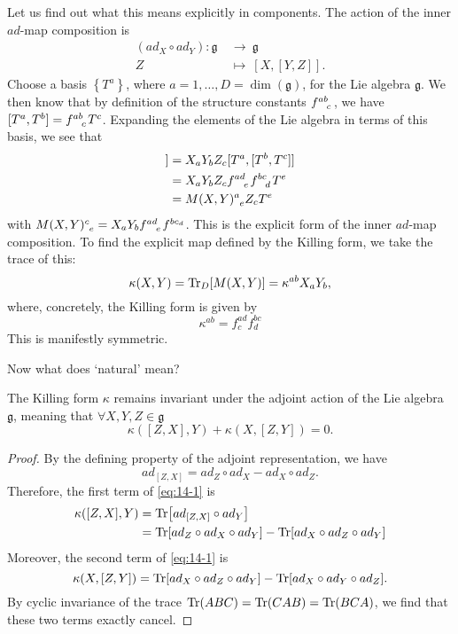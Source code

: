 Let us find out what this means explicitly in components.
The action of the inner $ad$-map composition is
\begin{equation}
  \begin{split}
    (ad_X \circ ad_Y) \colon \mathfrak{g} \ &\to\  \mathfrak{g} \\
    Z \ &\mapsto\  [X,[Y, Z]].
  \end{split}
\end{equation}
Choose a basis $\left\{ T^a \right\}$, where $a = 1, \dots, D=\dim(\mathfrak{g})$, for the Lie algebra $\mathfrak{g}$. 
We then know that by definition of the structure constants $f \indices{^{ab}_c}$, we have $[T^a, T^b] = f \indices{^{ab}_c} T^c$.
Expanding the elements of the Lie algebra in terms of this basis, we see that
\begin{align}
  [X, [Y, Z]] &= X_a Y_b Z_c [T^a, [T^b, T^c]] \\
	      &= X_a Y_b Z_c f \indices{^{ad}_e} f \indices{^{bc}_d} T^e \\
	      &= M(X, Y) \indices{^a_e} Z_c T^e
\end{align}
with $M(X, Y) \indices{^c_e} = X_a Y_b f \indices{^{ad}_e} f^{bc_d}$. This is the explicit form of the inner $ad$-map composition.
To find the explicit map defined by the Killing form, we take the trace of this:
\begin{equation}
  \kappa(X, Y) = \Tr_D [M(X, Y)] = \kappa^{ab} X_a Y_b,
\end{equation}
where, concretely, the Killing form is given by
\begin{equation}
  \boxed{\kappa^{ab} = f^{ad}_c f^{bc}_d}
\end{equation}
This is manifestly symmetric.

Now what does `natural' mean? 
\begin{claim}
  The Killing form $\kappa$ remains invariant under the adjoint action of the Lie algebra $\mathfrak{g}$, meaning that $\forall X, Y, Z \in \mathfrak{g}$
  \begin{equation}
    \label{eq:14-1}
    \boxed{\kappa([Z, X], Y) + \kappa(X, [Z, Y]) = 0}.
  \end{equation}
\end{claim}
\begin{proof}
  By the defining property of the adjoint representation, we have
  \begin{equation}
    ad_{[Z, X]} = ad_Z \circ ad_X - ad_X \circ ad_Z.
  \end{equation}
  Therefore, the first term of \eqref{eq:14-1} is
  \begin{align}
    \kappa([Z, X], Y) &= \Tr[ad_{[Z, X]} \circ ad_Y] \\
		      &= \Tr[ad_Z \circ ad_X \circ ad_Y] - \Tr[ad_X \circ ad_Z \circ ad_Y]
  \end{align}
  Moreover, the second term of \eqref{eq:14-1} is
  \begin{equation}
    \kappa (X, [Z, Y]) = \Tr[ad_X \circ ad_Z \circ ad_Y] - \Tr[ad_X \circ ad_Y \circ ad_Z].
  \end{equation}
  By cyclic invariance of the trace $\Tr(ABC) = \Tr(CAB) = \Tr(BCA)$, we find that these two terms exactly cancel.
\end{proof}
